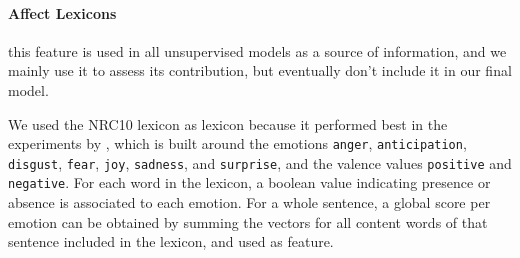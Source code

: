 \documentclass[11pt]{article}
\newcommand{\note}[1]{\textbf{*** #1 ***}}
\begin{document}
%

\paragraph{Affect Lexicons} this feature is used in all unsupervised models as a source of information, and we mainly use it to assess its contribution, but eventually don't include it in our final model. 

We used the NRC10 lexicon as lexicon because it performed best in the experiments by \cite{mohammad:2012:NAACL-HLT}, which is built around the emotions \texttt{anger}, \texttt{anticipation}, \texttt{disgust}, \texttt{fear}, \texttt{joy}, \texttt{sadness}, and \texttt{surprise}, and the valence values \texttt{positive} and \texttt{negative}. For each word in the lexicon, a boolean value indicating presence or absence is associated to each emotion. For a whole sentence, a global score per emotion can be obtained by summing the vectors for all content words of that sentence included in the lexicon, and used as feature.
%
\end{document}

